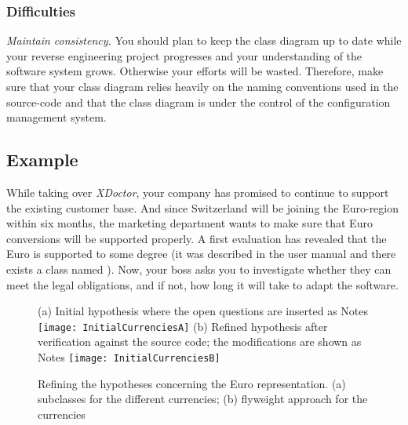 \documentclass[a4paper,10pt,twoside]{book}
\begin{document}
\subsubsection*{Difficulties}

\begin{bulletlist}
\item \emph{Maintain consistency.}
You should plan to keep the class diagram up to date while your reverse engineering project 
progresses and your understanding of the software system grows. Otherwise your efforts will 
be wasted. Therefore, make sure that your class diagram relies heavily on the naming 
conventions used in the source-code and that the class diagram is under the control of the 
configuration management system.
\end{bulletlist}

\subsection*{Example}

While taking over \emph{XDoctor}, your company has promised to continue to support the 
existing customer base. And since Switzerland will be joining the Euro-region within six 
months, the marketing department wants to make sure that Euro conversions will be supported 
properly. A first evaluation has revealed that the Euro is supported to some degree (\ie it 
was described in the user manual and there exists a class named ). Now, your 
boss asks you to investigate whether they can meet the legal obligations, and if not, how 
long it will take to adapt the software.

\begin{figure}
\begin{center}
{\small (a) Initial hypothesis where the open questions are inserted as Notes}
\texttt{[image: InitialCurrenciesA]}
{\small (b) Refined hypothesis after verification against the source code; the 
modifications are shown as Notes}
\texttt{[image: InitialCurrenciesB]}
\caption{Refining the hypotheses concerning the Euro representation. (a) subclasses for the 
different currencies; (b) flyweight approach for the currencies}
\end{center}
\end{figure}
\end{document}
